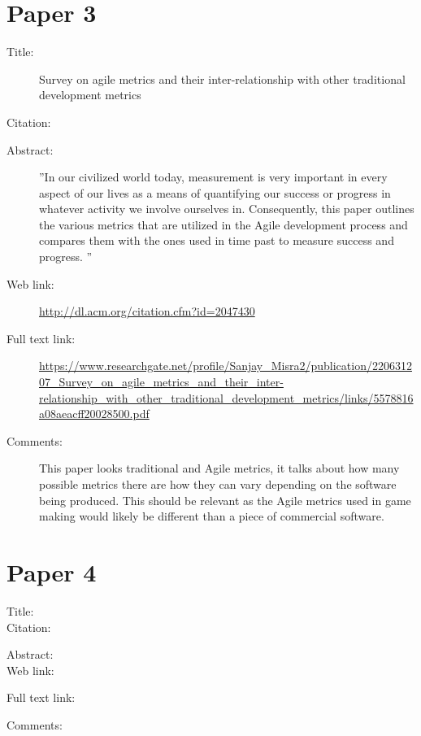 \documentclass{scrartcl}
\begin{document}
\section*{Paper 3}
\begin{description}
	\item[Title:] Survey on agile metrics and their inter-relationship with other traditional development metrics
	\item[Citation:] \cite{Misra}
	\item[Abstract:] ''In our civilized world today, measurement is very important in every aspect of our lives as a means of quantifying our success or progress in whatever activity we involve ourselves in. Consequently, this paper outlines the various metrics that are utilized in the Agile development process and compares them with the ones used in time past to measure success and progress. ''
	\item[Web link:] \url{http://dl.acm.org/citation.cfm?id=2047430}
	\item[Full text link:] \url{https://www.researchgate.net/profile/Sanjay_Misra2/publication/220631207_Survey_on_agile_metrics_and_their_inter-relationship_with_other_traditional_development_metrics/links/5578816a08aeacff20028500.pdf}
	\item[Comments:] This paper looks traditional and Agile metrics, it talks about how many possible metrics there are how they can vary depending on the software being produced. This should be relevant as the Agile metrics used in game making would likely be different than a piece of commercial software.
\end{description}

\section*{Paper 4}
\begin{description}
	\item[Title:]
	\item[Citation:] \cite{}
	\item[Abstract:]
	\item[Web link:] \url{}
	\item[Full text link:] \url{}
	\item[Comments:] 
\end{description}








\end{document}
